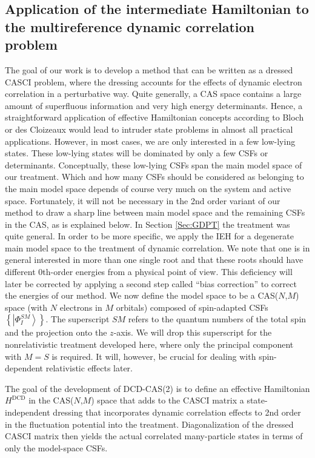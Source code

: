 \subsection{Application of the intermediate Hamiltonian to the multireference dynamic correlation problem}
The goal of our work is to develop a method that can be written as a dressed CASCI problem, where the dressing accounts for the effects of dynamic electron correlation in a perturbative way. Quite generally, a CAS space contains a large amount of superfluous information and very high energy determinants. Hence, a straightforward application of effective Hamiltonian concepts according to Bloch or des Cloizeaux would lead to intruder state problems in almost all practical applications. However, in most cases, we are only interested in a few low-lying states. These low-lying states will be dominated by only a few CSFs or determinants. Conceptually, these low-lying CSFs span the main model space of our treatment. Which and how many CSFs should be considered as belonging to the main model space depends of course very much on the system and active space. Fortunately, it will not be necessary in the 2nd order variant of our method to draw a sharp line between main model space and the remaining CSFs in the CAS, as is explained below. 
In Section \ref{Sec:GDPT} the treatment was quite general. In order to be more specific, we apply the IEH for a degenerate main model space to the treatment of dynamic correlation. We note that one is in general interested in more than one single root and that these roots should have different 0th-order energies from a physical point of view. This deficiency will later be corrected by applying a second step called “bias correction” to correct the energies of our method. We now define the model space to be a CAS($N$,$M$) space (with $N$ electrons in $M$ orbitals) composed of spin-adapted CSFs $\left\{ {\left| {\Phi _I^{SM}} \right\rangle } \right\}$. The superscript $SM$ refers to the quantum numbers of the total spin and the projection onto the $z$-axis. We will drop this superscript for the nonrelativistic treatment developed here, where only the principal component with $M = S$ is required. It will, however, be crucial for dealing with spin-dependent relativistic effects later. 

The goal of the development of DCD-CAS(2) is to define an effective Hamiltonian ${H^{{\text{DCD}}}}$ in the CAS($N$,$M$) space that adds to the CASCI matrix a state-independent dressing that incorporates dynamic correlation effects to 2nd order in the fluctuation potential into the treatment. Diagonalization of the dressed CASCI matrix then yields the actual correlated many-particle states in terms of only the model-space CSFs.

